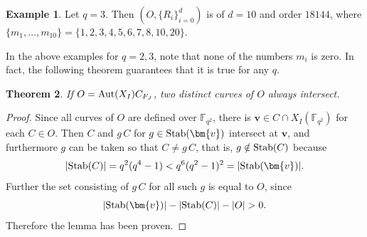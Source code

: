 \documentclass[11pt]{amsart}
\newcommand{\pmat}[1]{\begin{pmatrix} #1 \end{pmatrix}}
\theoremstyle{plain} %
\newtheorem{thm}{Theorem}[section] %
\theoremstyle{definition} %
\newtheorem{ex}[thm]{Example} %
\theoremstyle{remark} %
\begin{document}
\begin{ex}\label{con2ex2}%
Let $q=3$. Then $\left(O,\{R_i\}_{i=0}^d\right)$ is of $d=10$ and order $18144$, where $\{m_1,\dots,m_{10}\}=\{1,2,3,4,5,6,7,8,10,20\}$. %
\end{ex}
In the above examples for $q=2,3$, note that none of the numbers $m_i$ is zero.
In fact, the following theorem guarantees that it is true for any $q$.
\begin{thm}\label{lem5}
If $O={\rm Aut}(X_I)C_{F_J}$,
two distinct curves of $O$ always intersect.
\end{thm}
\begin{proof}
Since all curves of $O$ are defined over $\mathbb{F}_{q^2}$, there is $\bm{v}\in C\cap X_I(\mathbb{F}_{q^2})$ for each $C\in O$. Then $C$ and $g\,C$ for $g\in{\rm Stab}(\bm{v})$ intersect at $\bm{v}$, and furthermore $g$ can be taken so that $C\neq g\,C$, that is, $g\notin{\rm Stab}(C)$ because
$$
|{\rm Stab}(C)|=q^2(q^4-1)<q^6(q^2-1)^2
=|{\rm Stab}(\bm{v})|.
$$
Further the set consisting of $g\,C$ for all such $g$ is equal to $O$, since
$$
|{\rm Stab}(\bm{v})|-|{\rm Stab}(C)|-|O|>0.
$$
Therefore the lemma has been proven.
\end{proof}
\end{document}
